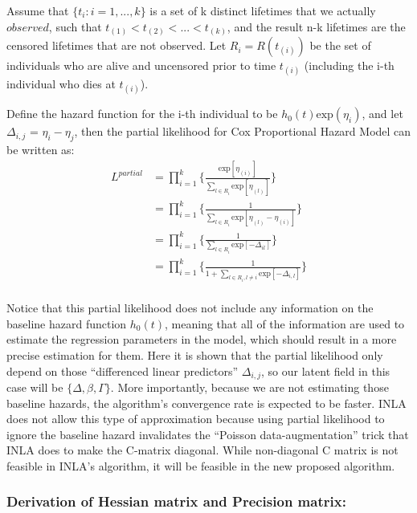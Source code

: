 \documentclass[]{article}
\begin{document}
Assume that \(\{t_i:i=1,...,k\}\) is a set of k distinct lifetimes that
we actually \(observed\), such that
\(t_{(1)} < t_{(2)} < ... <t_{(k)}\), and the result n-k lifetimes are
the censored lifetimes that are not observed. Let \(R_i = R(t_{(i)})\)
be the set of individuals who are alive and uncensored prior to time
\(t_{(i)}\) (including the i-th individual who dies at \(t_{(i)}\)).

Define the hazard function for the i-th individual to be
\(h_0(t)\text{exp}(\eta_i)\), and let \(\Delta_{i,j}\) =
\(\eta_i -\eta_j\), then the partial likelihood for Cox Proportional
Hazard Model can be written as:
\begin{equation}\begin{aligned}\label{eqn:partial}
L^{partial} &= \prod_{i=1}^{k} \bigg\{\frac{\text{exp}[\eta_{(i)}]}{{\sum_{l\in R_i}^{}\text{exp}[\eta_{(l)}]}}\bigg \} \\
         &= \prod_{i=1}^{k} \bigg\{\frac{1}{{\sum_{l\in R_i}^{}\text{exp}[\eta_{(l)}-\eta_{(i)}]}}\bigg \} \\
         &= \prod_{i=1}^{k} \bigg\{\frac{1}{{\sum_{l\in R_i}^{}\text{exp}[-\Delta_{il}]}}\bigg \} \\
         &= \prod_{i=1}^{k} \bigg\{\frac{1}{{1 + \sum_{l\in R_i , l \neq i}^{}\text{exp}[-\Delta_{i,l}]}}\bigg \} \\
\end{aligned}\end{equation}

Notice that this partial likelihood does not include any information on
the baseline hazard function \(h_0(t)\), meaning that all of the
information are used to estimate the regression parameters in the model,
which should result in a more precise estimation for them. Here it is
shown that the partial likelihood only depend on those ``differenced
linear predictors'' \(\Delta_{i,j}\), so our latent field in this case
will be \(\{ \Delta,\beta,\Gamma \}\). More importantly, because we are
not estimating those baseline hazards, the algorithm's convergence rate
is expected to be faster. INLA does not allow this type of approximation
because using partial likelihood to ignore the baseline hazard
invalidates the ``Poisson data-augmentation'' trick that INLA does to
make the C-matrix diagonal. While non-diagonal C matrix is not feasible
in INLA's algorithm, it will be feasible in the new proposed algorithm.

\hypertarget{derivation-of-hessian-matrix-and-precision-matrix}{%
\subsubsection{Derivation of Hessian matrix and Precision
matrix:}\label{derivation-of-hessian-matrix-and-precision-matrix}}
\end{document}

